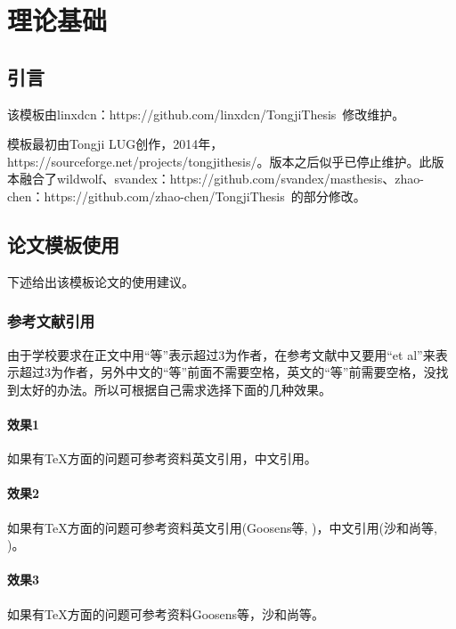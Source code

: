 \chapter{理论基础}
\label{chap:basis}

\section{引言}

该模板由linxdcn：https://github.com/linxdcn/TongjiThesis~修改维护。

模板最初由Tongji LUG创作，2014年，https://sourceforge.net/projects/tongjithesis/。版本之后似乎已停止维护。此版本融合了wildwolf、svandex：https://github.com/svandex/masthesis、zhao-chen：https://github.com/zhao-chen/TongjiThesis~的部分修改。

\section{论文模板使用}

下述给出该模板论文的使用建议。

\subsection{参考文献引用}

由于学校要求在正文中用“等”表示超过3为作者，在参考文献中又要用“et al”来表示超过3为作者，另外中文的“等”前面不需要空格，英文的“等”前需要空格，没找到太好的办法。所以可根据自己需求选择下面的几种效果。

\subsubsection{效果1}

如果有TeX方面的问题可参考资料英文引用\cite{companion}，中文引用\cite{shaheshang}。

\subsubsection{效果2}

如果有TeX方面的问题可参考资料英文引用(Goosens等, \citeyear{companion})，中文引用(沙和尚等, \citeyear{shaheshang})。

\subsubsection{效果3}

如果有TeX方面的问题可参考资料Goosens等\citeyearpar{companion}，沙和尚等\citeyearpar{shaheshang}。

